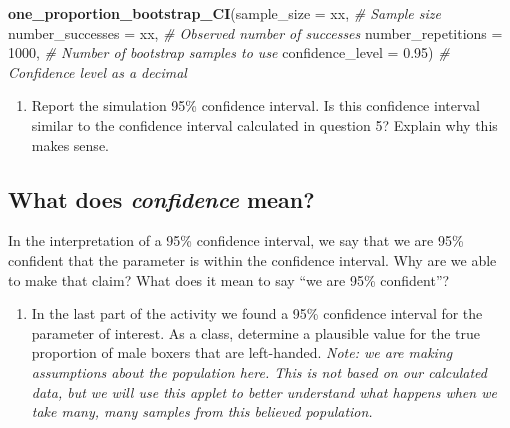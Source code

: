 \documentclass[
]{report}
\newenvironment{Shaded}{\begin{snugshade}}{\end{snugshade}}
\newcommand{\AttributeTok}[1]{\textcolor[rgb]{0.13,0.29,0.53}{#1}}
\newcommand{\CommentTok}[1]{\textcolor[rgb]{0.56,0.35,0.01}{\textit{#1}}}
\newcommand{\DecValTok}[1]{\textcolor[rgb]{0.00,0.00,0.81}{#1}}
\newcommand{\FloatTok}[1]{\textcolor[rgb]{0.00,0.00,0.81}{#1}}
\newcommand{\FunctionTok}[1]{\textcolor[rgb]{0.13,0.29,0.53}{\textbf{#1}}}
\newcommand{\NormalTok}[1]{#1}
\providecommand{\tightlist}{%
  \setlength{\itemsep}{0pt}\setlength{\parskip}{0pt}}
\begin{document}
\begin{Shaded}
\begin{Highlighting}[]
\FunctionTok{one\_proportion\_bootstrap\_CI}\NormalTok{(}\AttributeTok{sample\_size =}\NormalTok{ xx, }\CommentTok{\# Sample size}
                    \AttributeTok{number\_successes =}\NormalTok{ xx, }\CommentTok{\# Observed number of successes}
                    \AttributeTok{number\_repetitions =} \DecValTok{1000}\NormalTok{, }\CommentTok{\# Number of bootstrap samples to use}
                    \AttributeTok{confidence\_level =} \FloatTok{0.95}\NormalTok{) }\CommentTok{\# Confidence level as a decimal}
\end{Highlighting}
\end{Shaded}

\begin{enumerate}
\def\labelenumi{\arabic{enumi}.}
\setcounter{enumi}{7}
\tightlist
\item
  Report the simulation 95\% confidence interval. Is this confidence interval similar to the confidence interval calculated in question 5? Explain why this makes sense.
\end{enumerate}

\vspace{0.8in}

\hypertarget{what-does-confidence-mean}{%
\subsection*{\texorpdfstring{What does \emph{confidence} mean?}{What does confidence mean?}}\label{what-does-confidence-mean}}

In the interpretation of a 95\% confidence interval, we say that we are 95\% confident that the parameter is within the confidence interval. Why are we able to make that claim? What does it mean to say ``we are 95\% confident''?

\begin{enumerate}
\def\labelenumi{\arabic{enumi}.}
\setcounter{enumi}{8}
\tightlist
\item
  In the last part of the activity we found a 95\% confidence interval for the parameter of interest. As a class, determine a plausible value for the
  true proportion of male boxers that are left-handed. \emph{Note: we are making assumptions about the population here. This is not based on our calculated data, but we will use this applet to better understand what happens when we take many, many samples from this believed population.}
\end{enumerate}
\end{document}

